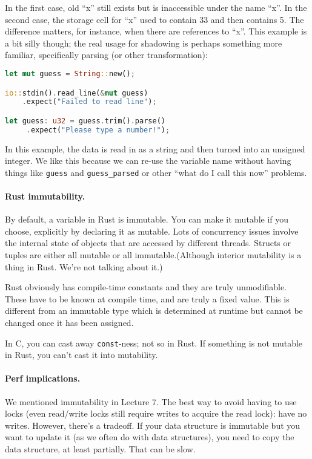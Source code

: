 In the first case, old ``x'' still exists but is inaccessible under the name ``x''.
In the second case, the storage cell for ``x'' used to contain 33 and then contains 5.
The difference matters, for instance, when there are references to ``x''. This example is a bit silly though; the real usage for shadowing is perhaps something more familiar, specifically parsing (or other transformation): 

\begin{lstlisting}[language=Rust]
let mut guess = String::new();

io::stdin().read_line(&mut guess)
    .expect("Failed to read line");

let guess: u32 = guess.trim().parse()
     .expect("Please type a number!");
\end{lstlisting}

In this example, the data is read in as a string and then turned into an unsigned integer. We like this because we can re-use the variable name without having things like \texttt{guess} and \texttt{guess\_parsed} or other ``what do I call this now'' problems.

\paragraph{Rust immutability.} 
By default, a variable in Rust is immutable. You can make it mutable if you choose, explicitly by declaring it as mutable. Lots of concurrency issues involve the internal state of objects that are accessed by different threads. Structs or tuples are either all mutable or all immutable.(Although interior mutability is a thing in Rust. We're not talking about it.)

Rust obviously has compile-time constants and they are truly unmodifiable. These have to be known at compile time, and are truly a fixed value. This is different from an immutable type which is determined at runtime but cannot be changed once it has been assigned.

In C, you can cast away {\tt const}-ness; not so in Rust.
If something is not mutable in Rust, you can't cast it into mutability.


\paragraph{Perf implications.}
We mentioned immutability in Lecture 7. The best way to avoid having
to use locks (even read/write locks still require writes to acquire
the read lock): have no writes.  However, there's a tradeoff. If your
data structure is immutable but you want to update it (as we often do
with data structures), you need to copy the data structure, at least
partially. That can be slow.



